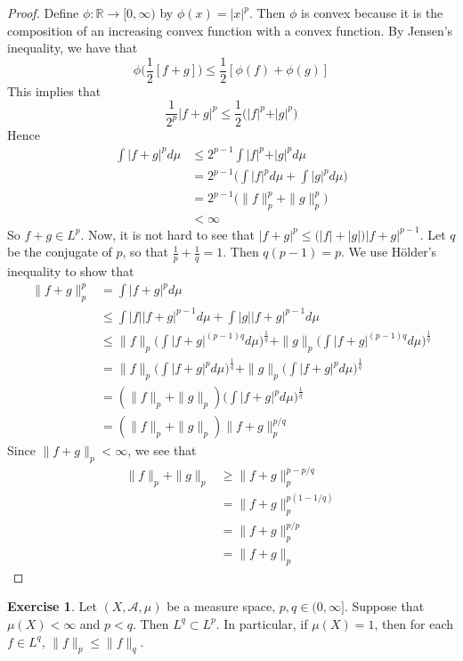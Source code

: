 \documentclass[12pt]{amsart}
\theoremstyle{definition}
\newtheorem{ex}[definition]{Exercise}
\newcommand{\R}{\mathbb{R}}
\newcommand{\MA}{\mathcal{A}}
\newcommand{\Rg}{[0,\infty)}
\begin{document}
	\begin{proof}
		Define $\phi:\R \rightarrow \Rg$ by $\phi(x) = \vert x \vert^p$. Then $\phi$ is convex because it is the composition of an increasing convex function with a convex function. By Jensen's inequality, we have that $$\phi\bigg(\frac{1}{2}[f+g] \bigg) \leq \frac{1}{2}[\phi(f)+\phi(g)]$$ 
		This implies that $$\frac{1}{2^p} \vert f+g\vert^p \leq \frac{1}{2}\bigg(\vert f\vert^p +\vert g \vert^p\bigg)$$ 
		Hence 
		\begin{align*}
			\int\vert f + g\vert^p d \mu 
			& \leq 2^{p-1}\int \vert f\vert^p +\vert g\vert^p d\mu \\
			& = 2^{p-1}\bigg(\int \vert f\vert^p d\mu + \int \vert g\vert^p d\mu \bigg) \\
			&= 2^{p-1}\bigg( \|f \|_p^p + \|g \|_p^p\bigg) \\
			& < \infty
		\end{align*}
		So $f+g \in L^p$. Now, it is not hard to see that $|f+g|^p \leq \big( |f| + |g| \big)|f+g|^{p-1}$. Let $q$ be the conjugate of $p$, so that $\frac{1}{p} + \frac{1}{q} = 1$. Then $q(p-1) = p$. We use Hölder's inequality to show that 
		\begin{align*}
			\|f+g \|_p ^p
			&= \int  |f+g|^p d \mu \\
			& \leq \int |f| |f+g|^{p-1} d \mu + \int |g| |f+g|^{p-1} d \mu \\
			& \leq \|f\|_p \bigg(\int |f+g|^{(p-1)q} d\mu\bigg)^{\frac{1}{q}} + \|g\|_p \bigg(\int |f+g|^{(p-1)q}d\mu\bigg)^{\frac{1}{q}} \\
			&= \|f\|_p \bigg(\int |f+g|^{p} d\mu\bigg)^{\frac{1}{q}} + \|g\|_p \bigg(\int |f+g|^{p}d\mu\bigg)^{\frac{1}{q}} \\ 
			&= (\|f\|_p + \|g \|_p) \bigg(\int |f+g|^{p} d\mu\bigg)^{\frac{1}{q}}\\
			&= (\|f \|_p + \|g \|_p) \|f+g \|_p^{p/q}
		\end{align*}
		Since $\|f+g \|_p < \infty$, we see that
		\begin{align*}
			\|f \|_p + \|g \|_p 
			& \geq \|f+g \|_p ^{p - p/q} \\
			&=  \|f+g \|_p ^{p(1 - 1/q)} \\
			&= \|f+g \|_p ^{p/p} \\
			&= \|f+g \|_p
		\end{align*}
	\end{proof}
	
	\begin{ex}
		Let $(X, \MA, \mu)$ be a measure space, $p,q \in (0, \infty]$. Suppose that $\mu(X) < \infty$ and $p < q$. Then $L^q \subset L^p$. In particular, if $\mu(X) = 1$, then for each $f \in L^q$, $\|f\|_p \leq \|f\|_q$.
	\end{ex}
	
\end{document}
